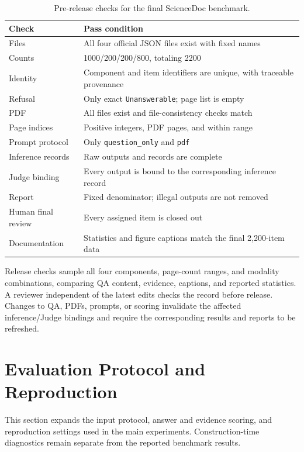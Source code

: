 \documentclass{article} %
\begin{document}
\begin{table}[!htb]
\centering
\caption{Pre-release checks for the final ScienceDoc benchmark.}
\label{tab:app_release_checklist}
\small
\begin{tabularx}{\linewidth}{l X}
\toprule
\textbf{Check} & \textbf{Pass condition} \\
\midrule
Files & All four official JSON files exist with fixed names \\
Counts & 1000/200/200/800, totaling 2200 \\
Identity & Component and item identifiers are unique, with traceable provenance \\
Refusal & Only exact \texttt{Unanswerable}; page list is empty \\
PDF & All files exist and file-consistency checks match \\
Page indices & Positive integers,  PDF pages, and within range \\
Prompt protocol & Only \texttt{question\_\allowbreak only} and \texttt{pdf} \\
Inference records & Raw outputs and records are complete \\
Judge binding & Every output is bound to the corresponding inference record \\
Report & Fixed denominator; illegal outputs are not removed \\
Human final review & Every assigned item is closed out \\
Documentation & Statistics and figure captions match the final 2,200-item data \\
\bottomrule
\end{tabularx}
\end{table}

Release checks sample all four components, page-count ranges, and modality combinations, comparing QA content, evidence, captions, and reported statistics. A reviewer independent of the latest edits checks the record before release. Changes to QA, PDFs, prompts, or scoring invalidate the affected inference/Judge bindings and require the corresponding results and reports to be refreshed.

\FloatBarrier

\section{Evaluation Protocol and Reproduction}
\label{app:detailed_protocol}

This section expands the input protocol, answer and evidence scoring, and reproduction settings used in the main experiments. Construction-time diagnostics remain separate from the reported benchmark results.
\end{document}

